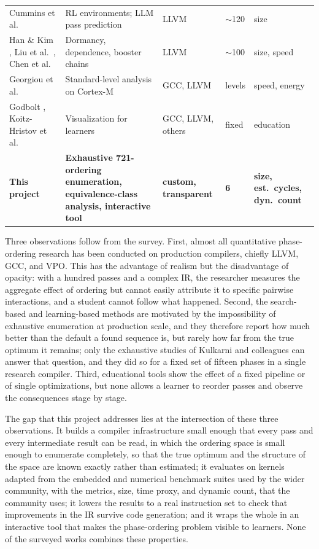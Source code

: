 \begin{table}[!tbp]
\begin{tabular}{L{3.1cm} L{2.7cm} L{2.3cm} L{1.7cm} L{2.7cm}}
Cummins et al.\ \cite{cummins2022,cummins2023} & RL environments; LLM pass prediction & LLVM & $\sim$120 & size\\
Han \& Kim \cite{han2024}, Liu et al.\ \cite{liu2024}, Chen et al.\ \cite{chen2025} & Dormancy, dependence, booster chains & LLVM & $\sim$100 & size, speed\\
Georgiou et al.\ \cite{georgiou2018} & Standard-level analysis on Cortex-M & GCC, LLVM & levels & speed, energy\\
Godbolt \cite{godbolt2019}, Koitz-Hristov et al.\ \cite{koitz2025} & Visualization for learners & GCC, LLVM, others & fixed & education\\
\textbf{This project} & \textbf{Exhaustive 721-ordering enumeration, equivalence-class analysis, interactive tool} & \textbf{custom, transparent} & \textbf{6} & \textbf{size, est.\ cycles, dyn.\ count}\\
\bottomrule
\end{tabular}
\end{table}

Three observations follow from the survey. First, almost all quantitative phase-ordering research has been conducted on production compilers, chiefly LLVM, GCC, and VPO. This has the advantage of realism but the disadvantage of opacity: with a hundred passes and a complex IR, the researcher measures the aggregate effect of ordering but cannot easily attribute it to specific pairwise interactions, and a student cannot follow what happened. Second, the search-based and learning-based methods are motivated by the impossibility of exhaustive enumeration at production scale, and they therefore report how much better than the default a found sequence is, but rarely how far from the true optimum it remains; only the exhaustive studies of Kulkarni and colleagues can answer that question, and they did so for a fixed set of fifteen phases in a single research compiler. Third, educational tools show the effect of a fixed pipeline or of single optimizations, but none allows a learner to reorder passes and observe the consequences stage by stage.

The gap that this project addresses lies at the intersection of these three observations. It builds a compiler infrastructure small enough that every pass and every intermediate result can be read, in which the ordering space is small enough to enumerate completely, so that the true optimum and the structure of the space are known exactly rather than estimated; it evaluates on kernels adapted from the embedded and numerical benchmark suites used by the wider community, with the metrics, size, time proxy, and dynamic count, that the community uses; it lowers the results to a real instruction set to check that improvements in the IR survive code generation; and it wraps the whole in an interactive tool that makes the phase-ordering problem visible to learners. None of the surveyed works combines these properties.
